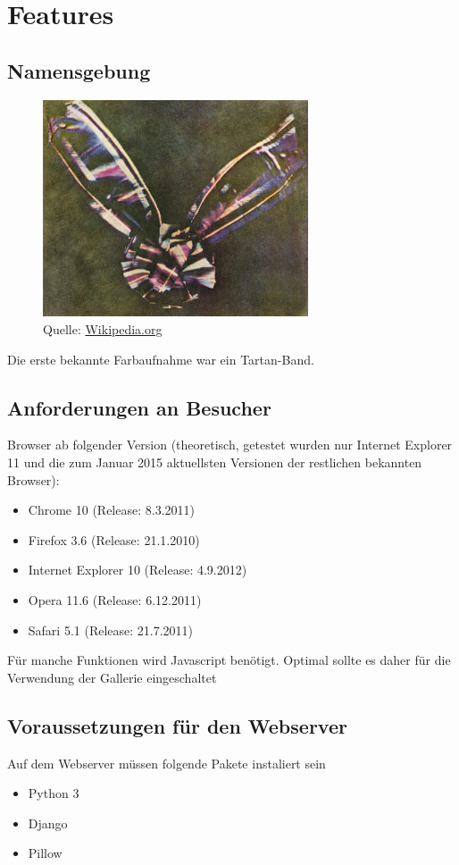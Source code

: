 \chapter{Features}

\section{Namensgebung}
\begin{figure}[h]
  \centering
  \includegraphics[width=0.7\textwidth]{images/tartan_band.jpg}
  \caption{Quelle: \url{Wikipedia.org}}
\end{figure}
Die erste bekannte Farbaufnahme war ein Tartan-Band.

\section{Anforderungen an Besucher}\label{besAnforderungen}
Browser ab folgender Version (theoretisch, getestet wurden nur Internet Explorer 11 und die zum Januar 2015 aktuellsten Versionen der restlichen bekannten Browser):
\begin{itemize}
	\item Chrome 10 (Release: 8.3.2011)
	\item Firefox 3.6 (Release: 21.1.2010)
	\item Internet Explorer 10 (Release: 4.9.2012)
	\item Opera 11.6 (Release: 6.12.2011)
	\item Safari 5.1 (Release: 21.7.2011)
\end{itemize}

Für manche Funktionen wird Javascript benötigt. Optimal sollte es daher für die Verwendung der Gallerie eingeschaltet

\section{Voraussetzungen für den Webserver}
Auf dem Webserver müssen folgende Pakete instaliert sein
\begin{itemize}
	\item Python 3
	\item Django
	\item Pillow
\end{itemize}